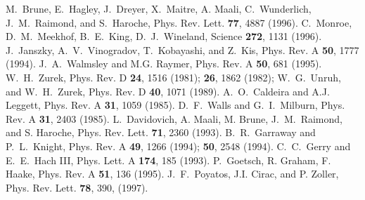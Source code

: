 \documentclass[12pt,twoside,a4paper]{report}
\begin{document}
{\begin{thebibliography}{999}
 M.~Brune, E.~Hagley, J.~Dreyer, X.~Maitre, A.
  Maali, C.~Wunderlich, J.~M.~Raimond, and S.~Haroche, Phys. Rev. Lett.
  {\bf 77}, 4887 (1996).  
 C.~Monroe, D.~M.~Meekhof, B.~E.~King, D.~J.~Wineland, Science {\bf 272}, 1131 (1996).  
 J.~Janszky, A.~V.~Vinogradov, T.~Kobayashi, and Z.~Kis, Phys. Rev. A {\bf 50}, 1777 (1994).  
 J.~A.~Walmsley and M.G. Raymer, Phys. Rev. A {\bf 50}, 681 (1995).  
 W.~H.~Zurek, Phys. Rev. D {\bf 24}, 1516 (1981); {\bf 26}, 1862 (1982); W.~G.~Unruh, and W.~H.~Zurek, Phys. Rev. D {\bf 40}, 1071 (1989).  
 A.~O.~Caldeira and A.J. Leggett, Phys. Rev. A {\bf 31}, 1059 (1985).
 D.~F.~Walls and G.~I.~Milburn,  Phys. Rev. A {\bf 31}, 2403 (1985).  
 L.~Davidovich, A. Maali, M. Brune,  J.~M.~Raimond, and S. Haroche, Phys. Rev. Lett. {\bf 71}, 2360 (1993).
 B.~R.~Garraway and P.~L.~Knight, Phys. Rev. A {\bf 49}, 1266 (1994); {\bf 50}, 2548 (1994).  
 C.~C.~Gerry and  E.~E.~Hach III,  Phys. Lett. A {\bf 174}, 185 (1993).  
 P.~Goetsch, R. Graham, F. Haake,   Phys. Rev. A {\bf 51}, 136 (1995).
 J.~F.~Poyatos, J.I. Cirac, and P. Zoller, Phys. Rev. Lett.  {\bf 78}, 390, (1997).  


\end{thebibliography}}
\end{document}
